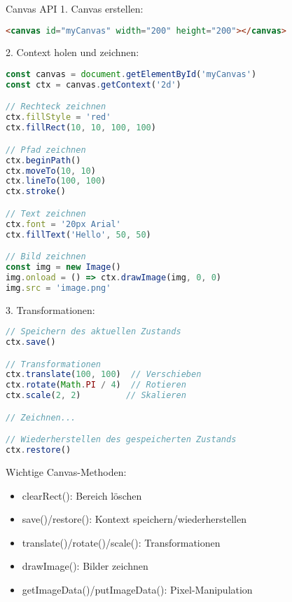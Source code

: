 \begin{KR}{Canvas API}
1. Canvas erstellen:
\begin{lstlisting}[language=HTML, style=basesmol]
<canvas id="myCanvas" width="200" height="200"></canvas>
\end{lstlisting}

2. Context holen und zeichnen:
\begin{lstlisting}[language=JavaScript, style=basesmol]
const canvas = document.getElementById('myCanvas')
const ctx = canvas.getContext('2d')

// Rechteck zeichnen
ctx.fillStyle = 'red'
ctx.fillRect(10, 10, 100, 100)

// Pfad zeichnen
ctx.beginPath()
ctx.moveTo(10, 10)
ctx.lineTo(100, 100)
ctx.stroke()

// Text zeichnen
ctx.font = '20px Arial'
ctx.fillText('Hello', 50, 50)

// Bild zeichnen
const img = new Image()
img.onload = () => ctx.drawImage(img, 0, 0)
img.src = 'image.png'
\end{lstlisting}

3. Transformationen:
\begin{lstlisting}[language=JavaScript, style=basesmol]
// Speichern des aktuellen Zustands
ctx.save()

// Transformationen
ctx.translate(100, 100)  // Verschieben
ctx.rotate(Math.PI / 4)  // Rotieren
ctx.scale(2, 2)         // Skalieren

// Zeichnen...

// Wiederherstellen des gespeicherten Zustands
ctx.restore()
\end{lstlisting}

Wichtige Canvas-Methoden:
\begin{itemize}
  \item clearRect(): Bereich löschen
  \item save()/restore(): Kontext speichern/wiederherstellen
  \item translate()/rotate()/scale(): Transformationen
  \item drawImage(): Bilder zeichnen
  \item getImageData()/putImageData(): Pixel-Manipulation
\end{itemize}
\end{KR}